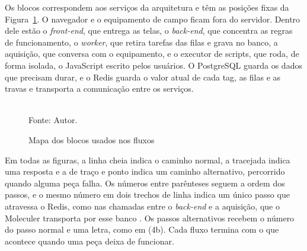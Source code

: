 \par Os blocos correspondem aos serviços da arquitetura e têm as posições fixas da Figura~\ref{fig:fx_mapa}. O navegador e o equipamento de campo ficam fora do servidor. Dentro dele estão o \emph{front-end}, que entrega as telas, o \emph{back-end}, que concentra as regras de funcionamento, o \emph{worker}, que retira tarefas das filas e grava no banco, a aquisição, que conversa com o equipamento, e o executor de scripts, que roda, de forma isolada, o JavaScript escrito pelos usuários. O PostgreSQL guarda os dados que precisam durar, e o Redis guarda o valor atual de cada tag, as filas e as travas e transporta a comunicação entre os serviços.

\begin{figure}[H]
    \centering
    \caption{Mapa dos blocos usados nos fluxos}
    \label{fig:fx_mapa}
    \vspace{0.4cm}
    \vspace{0.2cm} \\
    Fonte: Autor.
\end{figure}

\par Em todas as figuras, a linha cheia indica o caminho normal, a tracejada indica uma resposta e a de traço e ponto indica um caminho alternativo, percorrido quando alguma peça falha. Os números entre parênteses seguem a ordem dos passos, e o mesmo número em dois trechos de linha indica um único passo que atravessa o Redis, como nas chamadas entre o \emph{back-end} e a aquisição, que o Moleculer transporta por esse banco \cite{MOLECULER_DOCS,REDIS_DOCS}. Os passos alternativos recebem o número do passo normal e uma letra, como em (4b). Cada fluxo termina com o que acontece quando uma peça deixa de funcionar.

